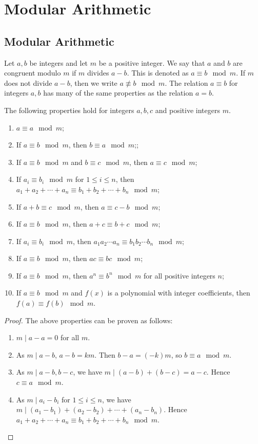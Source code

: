 \chapter{Modular Arithmetic}
\label{mod}
\section{Modular Arithmetic}
Let $a, b$ be integers and let $m$ be a positive integer.  We say that $a$ and $b$ are congruent modulo $m$ if $m$ divides $a-b$.  This is denoted as $a\equiv b\mod{m}$.  If $m$ does not divide $a-b$, then we write $a\not\equiv b\mod{m}$.  The relation $a \equiv b$ for integers $a, b$ has many of the same properties as the relation $a = b$.
\begin{pr}
The following properties hold for integers $a,b,c$ and positive integers $m$.
\begin{enumerate}
\item $a\equiv a\mod{m}$;
\item If $a\equiv b\mod{m}$, then $b\equiv a\mod{m}$;;
\item If $a\equiv b\mod{m}$ and $b\equiv c\mod{m}$, then $a\equiv c\mod{m}$;
\item If $a_i\equiv b_i\mod{m}$ for $1 \le i \le n$, then $a_1+a_2+\cdots+a_n\equiv b_1+b_2+\cdots+b_n\mod{m}$;
\item If $a+b\equiv c\mod{m}$, then $a\equiv c-b\mod{m}$;
\item If $a\equiv b\mod{m}$, then $a+c\equiv b+c\mod{m}$;
\item If $a_i\equiv b_i\mod{m}$, then $a_1a_2\cdots a_n\equiv b_1b_2\cdots b_n\mod{m}$;
\item If $a\equiv b\mod{m}$, then $ac\equiv bc\mod{m}$;
\item If $a\equiv b\mod{m}$, then $a^n \equiv b^n\mod{m}$ for all positive integers $n$;
\item If $a\equiv b\mod{m}$ and $f(x)$ is a polynomial with integer coefficients, then $f(a) \equiv f(b)\mod{m}$.
\end{enumerate}
\begin{proof}
The above properties can be proven as follows:
\begin{enumerate}
\item $m \mid a-a = 0$ for all $m$.
\item As $m\mid a-b$, $a-b = km$.  Then $b-a = (-k)m$, so $b\equiv a\mod{m}$.
\item As $m\mid a-b, b-c$, we have $m\mid (a-b)+(b-c) = a-c$.  Hence $c\equiv a\mod{m}$.
\item As $m\mid a_i-b_i$ for $1\le i\le n$, we have $m\mid (a_1-b_1)+(a_2-b_2)+\cdots+(a_n-b_n)$.  Hence $a_1+a_2+\cdots+a_n \equiv b_1+b_2+\cdots+b_n\mod{m}$.

\end{enumerate}
\end{proof}
\end{pr}
